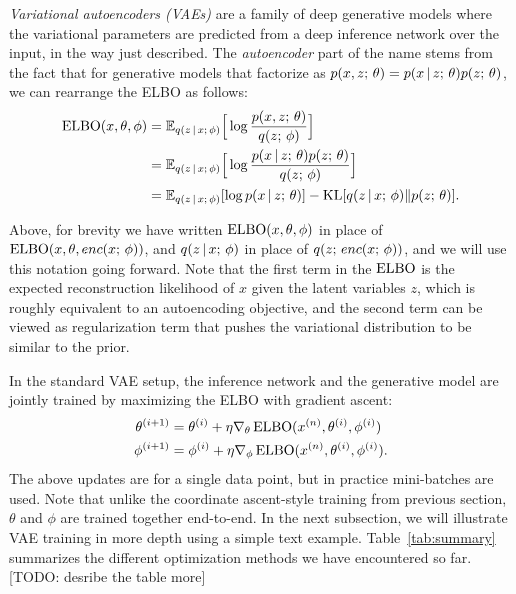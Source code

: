 \documentclass{article}
\begin{document}
\emph{Variational autoencoders (VAEs)} \citep{Kingma2014,Rezende2014,Mnih2014} are a family of 
deep generative models where the variational parameters are predicted from a deep inference network
over the input, in the way just described. The \emph{autoencoder} part of the name stems from the fact that for generative models that factorize as  $p(x, z ; \, \theta) = p(x \,|\, z ; \, \theta)p(z ; \, \theta)$, we can rearrange the ELBO as follows:
\begin{align} \label{eq:vaeelbo}
\operatorname*{ELBO}(x, \theta, \phi) &= \mathbb{E}_{q(z \,|\, x ; \, \phi )} \Big [\log \frac{p(x, z ; \, \theta)}{q(z ; \, \phi)}\Big] \nonumber \\
&= \mathbb{E}_{q(z \,|\, x ; \, \phi )} \Big[ \log \frac{p(x \,|\, z ; \, \theta) p(z ; \, \theta)}{q(z ; \, \phi)}\Big] \nonumber \\ 
&= \mathbb{E}_{q(z \,|\, x ; \, \phi )}[\log p(x \,|\, z ; \, \theta)] - \operatorname*{KL}[q(z \,|\, x ; \, \phi)  \Vert  p(z ; \, \theta)].
\end{align}

Above, for brevity we have written $ \operatorname*{ELBO}(x, \theta, \phi)$ in place of $\operatorname*{ELBO}(x, \theta, enc(x ; \, \phi))$, and $q(z \,|\, x ; \, \phi)$ in place of $q(z ; \, enc(x ; \, \phi))$, and we will use this notation going forward. Note that the first term in the $\operatorname*{ELBO}$ is the expected reconstruction likelihood of $x$ given the latent variables $z$, which is roughly equivalent to an autoencoding objective,
and the second term can be viewed as regularization term that pushes the variational distribution to be similar to the prior.

In the standard VAE setup, the inference network and the generative model are jointly trained by maximizing the ELBO with gradient ascent:
\begin{align*}
\theta^{(i+1)} &= \theta^{(i)} + \eta \nabla_{\theta} \operatorname*{ELBO}(x^{(n)}, \theta^{(i)}, \phi^{(i)}) \\
\phi^{(i+1)} &= \phi^{(i)} + \eta \nabla_{\phi} \operatorname*{ELBO}(x^{(n)}, \theta^{(i)}, \phi^{(i)}).
\end{align*}
The above updates are for a single data point, but in practice mini-batches are used. Note that unlike 
the coordinate ascent-style training from previous section, $\theta$ and $\phi$ are trained
together end-to-end. In the next subsection, we will illustrate VAE training in more depth using a simple text example. Table~\ref{tab:summary} summarizes the different optimization methods
we have encountered so far. [TODO: desribe the table more]
\end{document}
